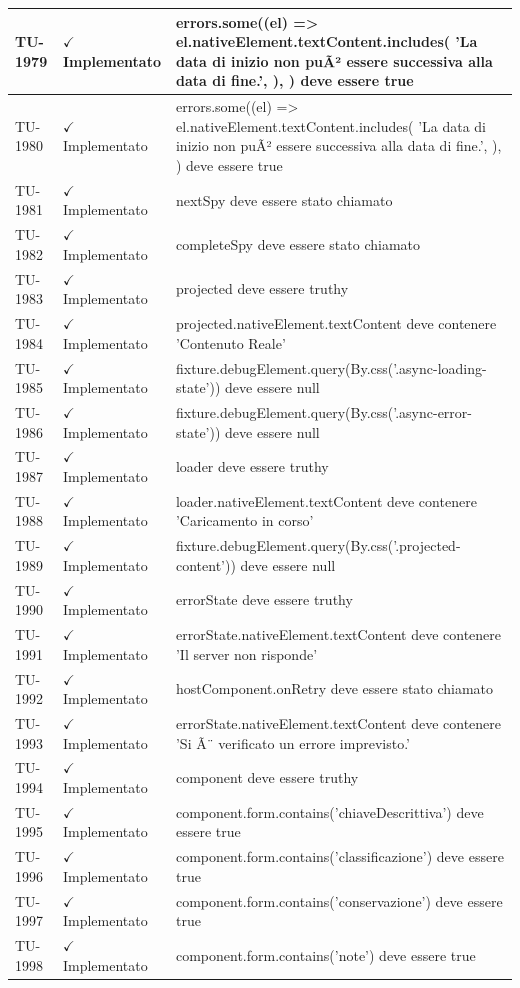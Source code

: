﻿\documentclass[a4paper,12pt]{article}
\newcommand{\ok}{\textcolor{green!60!black}{$\checkmark$ Implementato}}
\begin{document}
\begin{longtable}{|p{2cm}|p{3.5cm}|p{9.5cm}|}
\hline
TU-1979 & \ok & errors.some((el) => el.nativeElement.textContent.includes( 'La data di inizio non puÃ² essere successiva alla data di fine.', ), ) deve essere true \\
\hline
TU-1980 & \ok & errors.some((el) => el.nativeElement.textContent.includes( 'La data di inizio non puÃ² essere successiva alla data di fine.', ), ) deve essere true \\
\hline
TU-1981 & \ok & nextSpy deve essere stato chiamato \\
\hline
TU-1982 & \ok & completeSpy deve essere stato chiamato \\
\hline
TU-1983 & \ok & projected deve essere truthy \\
\hline
TU-1984 & \ok & projected.nativeElement.textContent deve contenere 'Contenuto Reale' \\
\hline
TU-1985 & \ok & fixture.debugElement.query(By.css('.async-loading-state')) deve essere null \\
\hline
TU-1986 & \ok & fixture.debugElement.query(By.css('.async-error-state')) deve essere null \\
\hline
TU-1987 & \ok & loader deve essere truthy \\
\hline
TU-1988 & \ok & loader.nativeElement.textContent deve contenere 'Caricamento in corso' \\
\hline
TU-1989 & \ok & fixture.debugElement.query(By.css('.projected-content')) deve essere null \\
\hline
TU-1990 & \ok & errorState deve essere truthy \\
\hline
TU-1991 & \ok & errorState.nativeElement.textContent deve contenere 'Il server non risponde' \\
\hline
TU-1992 & \ok & hostComponent.onRetry deve essere stato chiamato \\
\hline
TU-1993 & \ok & errorState.nativeElement.textContent deve contenere 'Si Ã¨ verificato un errore imprevisto.' \\
\hline
TU-1994 & \ok & component deve essere truthy \\
\hline
TU-1995 & \ok & component.form.contains('chiaveDescrittiva') deve essere true \\
\hline
TU-1996 & \ok & component.form.contains('classificazione') deve essere true \\
\hline
TU-1997 & \ok & component.form.contains('conservazione') deve essere true \\
\hline
TU-1998 & \ok & component.form.contains('note') deve essere true \\

\end{longtable}
\end{document}
